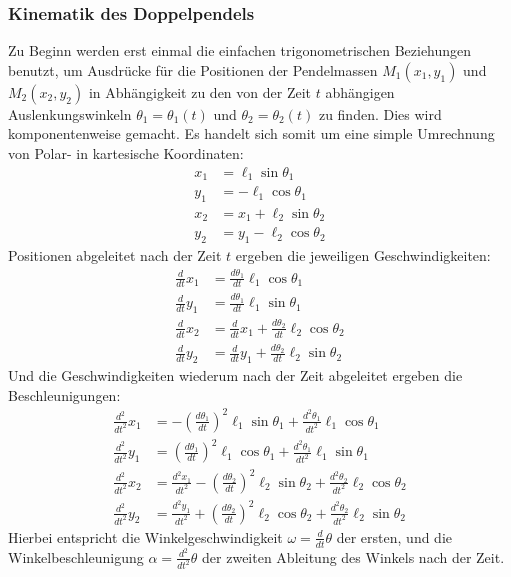 \documentclass[titlepage, 11pt, a4paper, ngerman]{article}
\begin{document}
\subsubsection{Kinematik des Doppelpendels}
Zu Beginn werden erst einmal die einfachen trigonometrischen Beziehungen benutzt, um Ausdrücke für die Positionen der Pendelmassen $M_{1} (x_{1}, y_{1})$ und $M_{2} (x_{2}, y_{2})$ in Abhängigkeit zu den von der Zeit $t$ abhängigen Auslenkungswinkeln $\theta_{1} = \theta_{1}(t)$ und $\theta_{2}= \theta_{2}(t)$ zu finden. Dies wird komponentenweise gemacht. Es handelt sich somit um eine simple Umrechnung von Polar- in kartesische Koordinaten:
\begin{align}
    x_{1} &= \ell_{1} \sin{\theta_{1}} \\
    y_{1} &= -\ell_{1} \cos{\theta_{1}} \\
    x_{2} &= x_{1} + \ell_{2} \sin{\theta_{2}} \\
    y_{2} &= y_{1} - \ell_{2} \cos{\theta_{2}}
\end{align}
\bigbreak
Positionen abgeleitet nach der Zeit $t$ ergeben die jeweiligen Geschwindigkeiten:
\begin{align}
    \frac{d}{dt} x_{1} &= \frac{d\theta_{1}}{dt} \ell_{1} \cos{\theta_{1}} \\
    \frac{d}{dt} y_{1} &= \frac{d\theta_{1}}{dt} \ell_{1} \sin{\theta_{1}} \\
    \frac{d}{dt} x_{2} &= \frac{d}{dt}x_{1} + \frac{d\theta_{2}}{dt} \ell_{2} \cos{\theta_{2}} \\
    \frac{d}{dt} y_{2} &= \frac{d}{dt}y_{1} + \frac{d\theta_{2}}{dt} \ell_{2} \sin{\theta_{2}}
\end{align}
\bigbreak
Und die Geschwindigkeiten wiederum nach der Zeit abgeleitet ergeben die Beschleunigungen:
\begin{align}
    \frac{d^2}{dt^2}x_{1} &= - (\frac{d\theta_{1}}{dt})^{2} \ell_{1} \sin{\theta_{1}} + \frac{d^{2}\theta_{1}}{dt^{2}} \ell_{1} \cos{\theta_{1}} \\
    \frac{d^{2}}{dt^{2}}y_{1} &= (\frac{d \theta_{1}}{dt})^{2} \ell_{1} \cos{\theta_{1}} + \frac{d^{2}\theta_{1}}{dt^{2}} \ell_{1} \sin{\theta_{1}} \\
    \frac{d^{2}}{dt^{2}}x_{2} &= \frac{d^{2}x_{1}}{dt^{2}} - (\frac{d \theta_{2}}{dt})^{2} \ell_{2} \sin{\theta_{2}} + \frac{d^{2}\theta_{2}}{dt^{2}} \ell_{2} \cos{\theta_{2}} \\
    \frac{d^{2}}{dt^{2}}y_{2} &= \frac{d^{2}y_{1}}{dt^{2}}
    + (\frac{d \theta_{2}}{dt})^{2} \ell_{2} \cos{\theta_{2}} + \frac{d^{2}\theta_{2}}{dt^{2}} \ell_{2} \sin{\theta_{2}}
\end{align}
\bigbreak
Hierbei entspricht die Winkelgeschwindigkeit $\omega = \frac{d}{dt} \theta$ der ersten, und die Winkelbeschleunigung $\alpha = \frac{d^{2}}{dt^{2}} \theta$ der zweiten Ableitung des Winkels nach der Zeit.
\end{document}
